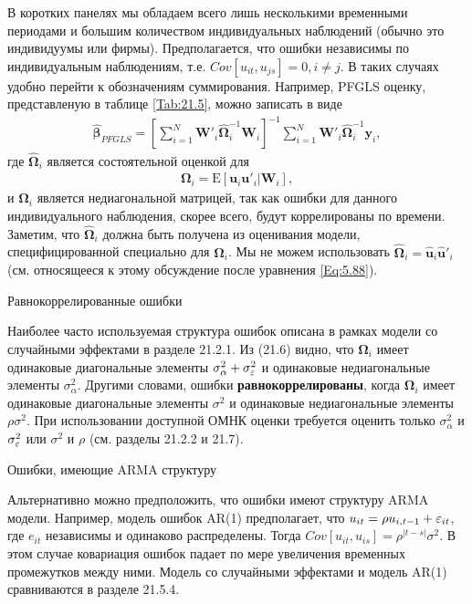 В коротких панелях мы обладаем всего лишь несколькими временными периодами и большим количеством индивидуальных наблюдений (обычно это индивидуумы или фирмы). Предполагается, что ошибки независимы по индивидуальным наблюдениям, т.е. $Cov[u_{it}, u_{js}]=0, i \neq j$. В таких случаях удобно перейти к обозначениям суммирования. Например, PFGLS оценку, представленую в таблице \ref{Tab:21.5}, можно записать в виде
\begin{align}
\hat{\bm\beta}_{PFGLS}=\left[\sum^N_{i=1} \mathbf W'_i \hat{\bm\Omega}^{-1}_i \mathbf W_i \right]^{-1} \sum^N_{i=1} \mathbf W'_i \hat{\bm\Omega}^{-1}_i \mathbf y_i,
\label{Eq:21.20}
\end{align}
где $\hat{\bm\Omega}_i$ является состоятельной оценкой для 
\begin{align}
\bm\Omega_i =\mathrm E[\mathbf u_i \mathbf u'_i | \mathbf W_i],
\label{Eq:21.21}
\end{align}
и $\bm\Omega_i$ является недиагональной матрицей, так как ошибки для данного индивидуального наблюдения, скорее всего, будут коррелированы по времени. Заметим, что $\hat{\bm\Omega}_i$ должна быть получена из оценивания модели, специфицированной специально для $\bm\Omega_i$. Мы не можем использовать $\hat{\bm\Omega}_i=\hat{\mathbf u}_i\hat{\mathbf u}'_i$ (см. относящееся к этому обсуждение после уравнения \ref{Eq:5.88}).

{\centering
Равнокоррелированные ошибки\\}

Наиболее часто используемая структура ошибок описана в рамках модели со случайными эффектами в разделе 21.2.1. Из (21.6) видно, что $\bm\Omega_i$ имеет одинаковые диагональные элементы $\sigma^2_{\alpha}+\sigma^2_{\varepsilon}$ и одинаковые недиагональные элементы $\sigma^2_{\alpha}$. Другими словами, ошибки \textbf{равнокоррелированы}, когда $\bm\Omega_i$ имеет одинаковые диагональные элементы $\sigma^2$ и одинаковые недиагональные элементы $\rho\sigma^2$. При использовании доступной ОМНК оценки требуется оценить только $\sigma^2_{\alpha}$ и $\sigma^2_{\varepsilon}$ или $\sigma^2$ и $\rho$ (см. разделы 21.2.2 и 21.7).

{\centering
Ошибки, имеющие ARMA структуру\\}

Альтернативно можно предположить, что ошибки имеют структуру ARMA модели. Например, модель ошибок AR(1) предполагает, что $u_{it}=\rho u_{i,t-1}+\varepsilon_{it}$, где $e_{it}$ независимы и одинаково распределены. Тогда  $Cov[u_{it}, u_{is}]=\rho^{|t-s|}\sigma^2$. В этом случае ковариация ошибок падает по мере увеличения временных промежутков между ними. Модель со случайными эффектами и модель AR(1) сравниваются в разделе 21.5.4.

